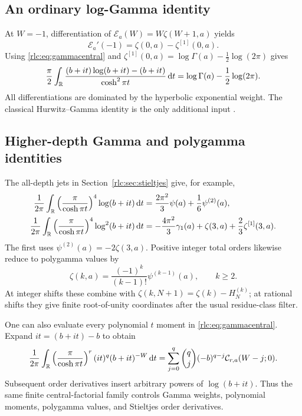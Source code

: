 \documentclass[11pt,a4paper]{article}
\numberwithin{equation}{section}
\theoremstyle{definition}\newtheorem{definition}[theorem]{Definition}
\theoremstyle{remark}\newtheorem{remark}[theorem]{Remark}
\newcommand{\dd}{\,\mathrm d}
\newcommand{\E}{\mathcal E}
\newcommand{\CC}{\mathcal C}
\begin{document}
\subsection{An ordinary log-Gamma identity}
At $W=-1$, differentiation of
$\E_a(W)=W\zeta(W+1,a)$ yields
\[
 \E_a'(-1)=\zeta(0,a)-\zeta^{[1]}(0,a).
\]
Using \eqref{rlc:eq:gammacentral} and
$\zeta^{[1]}(0,a)=\log\Gamma(a)-\tfrac12\log(2\pi)$ gives
\begin{equation}\label{rlc:eq:gammalog}
 \frac\pi2\int_\R\frac{
 (b+it)\log(b+it)-(b+it)}{\cosh^2\pi t}\dd t
      =\log\Gamma(a)-\frac12\log(2\pi).
\end{equation}
All differentiations are dominated by the hyperbolic exponential
weight. The classical Hurwitz--Gamma identity is the only additional
input \cite{DLMF}.

\subsection{Higher-depth Gamma and polygamma identities}
The all-depth jets in Section~\ref{rlc:sec:stieltjes} give, for example,
\begin{align}
 \frac1{2\pi}\int_\R
 \left(\frac\pi{\cosh\pi t}\right)^4\log(b+it)\dd t
 &=\frac{2\pi^2}{3}\psi(a)+\frac16\psi^{(2)}(a),
 \label{rlc:eq:gamma4log}\\
 \frac1{2\pi}\int_\R
 \left(\frac\pi{\cosh\pi t}\right)^4\log^2(b+it)\dd t
 &=-\frac{4\pi^2}{3}\gamma_1(a)
     +\zeta(3,a)+\frac23\zeta^{[1]}(3,a).
 \label{rlc:eq:gamma4log2}
\end{align}
The first uses $\psi^{(2)}(a)=-2\zeta(3,a)$.
Positive integer total orders likewise reduce to polygamma values by
\[
 \zeta(k,a)=\frac{(-1)^k}{(k-1)!}\psi^{(k-1)}(a),\qquad k\ge2.
\]
At integer shifts these combine with
$\zeta(k,N+1)=\zeta(k)-H_N^{(k)}$; at rational shifts they give finite
root-of-unity coordinates after the usual residue-class filter.

One can also evaluate every polynomial $t$ moment in
\eqref{rlc:eq:gammacentral}. Expand
$it=(b+it)-b$ to obtain
\begin{equation}\label{rlc:eq:tGamma}
 \frac1{2\pi}\int_\R
 \left(\frac\pi{\cosh\pi t}\right)^r(it)^q(b+it)^{-W}\dd t
 =\sum_{j=0}^{q}\binom qj(-b)^{q-j}\CC_{r,a}(W-j;0).
\end{equation}
Subsequent order derivatives insert arbitrary powers of $\log(b+it)$.
Thus the same finite central-factorial family controls Gamma weights,
polynomial moments, polygamma values, and Stieltjes order derivatives.
\end{document}
